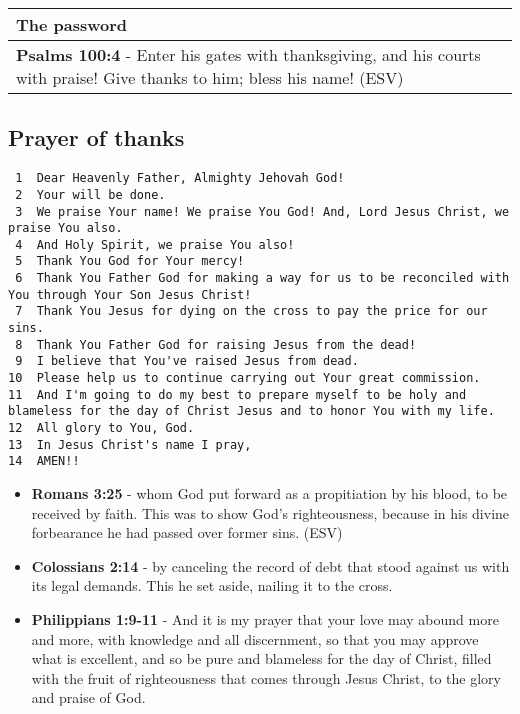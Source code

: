 \documentclass[11pt]{article}
\begin{document}
\begin{center}
\begin{tabular}{l}
The password\\[0pt]
\hline
\textbf{Psalms 100:4} -  Enter his gates with thanksgiving, and his courts with praise! Give thanks to him; bless his name!  (ESV)\\[0pt]
\end{tabular}
\end{center}

\subsection{Prayer of thanks}
\label{sec:org85d648e}
\begin{verbatim}
 1  Dear Heavenly Father, Almighty Jehovah God!
 2  Your will be done.
 3  We praise Your name! We praise You God! And, Lord Jesus Christ, we praise You also.
 4  And Holy Spirit, we praise You also!
 5  Thank You God for Your mercy! 
 6  Thank You Father God for making a way for us to be reconciled with You through Your Son Jesus Christ!
 7  Thank You Jesus for dying on the cross to pay the price for our sins.
 8  Thank You Father God for raising Jesus from the dead!
 9  I believe that You've raised Jesus from dead.
10  Please help us to continue carrying out Your great commission.
11  And I'm going to do my best to prepare myself to be holy and blameless for the day of Christ Jesus and to honor You with my life.
12  All glory to You, God.
13  In Jesus Christ's name I pray,
14  AMEN!!
\end{verbatim}

\begin{itemize}
\item \textbf{Romans 3:25} -  whom God put forward as a propitiation by his blood, to be received by faith.  This was to show God's righteousness, because in his divine forbearance he had passed over former sins.  (ESV)

\item \textbf{Colossians 2:14} - by canceling the record of debt that stood against us with its legal demands. This he set aside, nailing it to the cross.

\item \textbf{Philippians 1:9-11} - And it is my prayer that your love may abound more and more, with knowledge and all discernment, so that you may approve what is excellent, and so be pure and blameless for the day of Christ, filled with the fruit of righteousness that comes through Jesus Christ, to the glory and praise of God.
\end{itemize}
\end{document}
